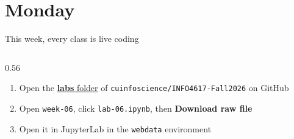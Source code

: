 \documentclass[9pt,aspectratio=169]{beamer}
\begin{document}
\section{Monday}

\begin{frame}{This week, every class is live coding}
    \begin{columns}[T]
        \begin{column}{0.56\textwidth}
            \begin{enumerate}\small
                \item Open the \href{https://github.com/cuinfoscience/INFO4617-Fall2026/tree/main/labs}{\textbf{labs} folder} of \texttt{cuinfoscience/INFO4617-Fall2026} on GitHub
                \item Open \texttt{week-06}, click \texttt{lab-06.ipynb}, then \textbf{Download raw file}
                \item Open it in JupyterLab in the \texttt{webdata} environment
            \end{enumerate}


\end{column}
\end{columns}
\end{frame}
\end{document}
